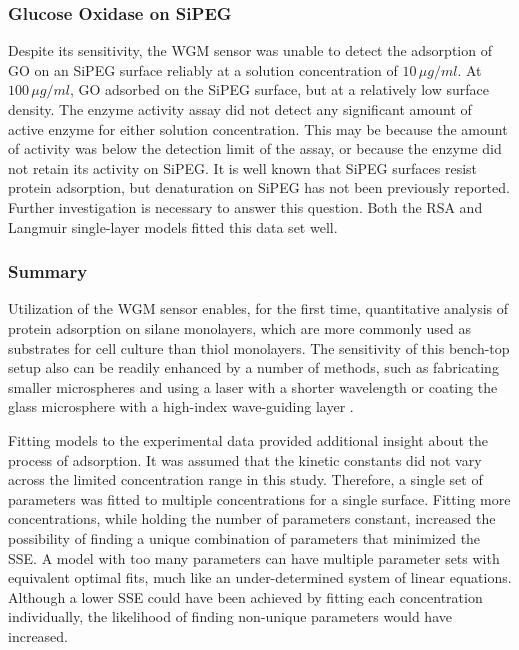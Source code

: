 \subsubsection{Glucose Oxidase on SiPEG}

Despite its sensitivity, the WGM sensor was unable to detect the adsorption
of GO on an SiPEG surface reliably at a solution concentration of
$10\,\mu g/ml$. At $100\,\mu g/ml$, GO adsorbed on the SiPEG surface,
but at a relatively low surface density. The enzyme activity assay
did not detect any significant amount of active enzyme for either
solution concentration. This may be because the amount of activity
was below the detection limit of the assay, or because the enzyme
did not retain its activity on SiPEG. It is well known that SiPEG
surfaces resist protein adsorption, but denaturation on SiPEG has
not been previously reported. Further investigation is necessary to
answer this question. Both the RSA and Langmuir single-layer models
fitted this data set well.


\subsubsection{Summary}

Utilization of the WGM sensor enables, for the first time, quantitative
analysis of protein adsorption on silane monolayers, which are more
commonly used as substrates for cell culture than thiol monolayers.
The sensitivity of this bench-top setup also can be readily enhanced
by a number of methods, such as fabricating smaller microspheres and
using a laser with a shorter wavelength \cite{Vollmer2008a} or coating
the glass microsphere with a high-index wave-guiding layer \cite{Teraoka2006}. 

Fitting models to the experimental data provided additional insight
about the process of adsorption. It was assumed that the kinetic constants
did not vary across the limited concentration range in this study.
Therefore, a single set of parameters was fitted to multiple concentrations
for a single surface. Fitting more concentrations, while holding the
number of parameters constant, increased the possibility of finding
a unique combination of parameters that minimized the SSE. A model
with too many parameters can have multiple parameter sets with equivalent
optimal fits, much like an under-determined system of linear equations.
Although a lower SSE could have been achieved by fitting each concentration
individually, the likelihood of finding non-unique parameters would
have increased. 

